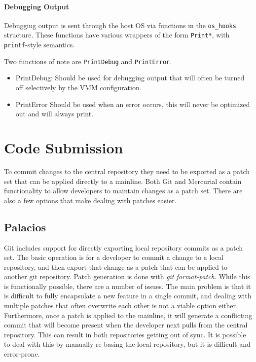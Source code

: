 \documentclass[11pt]{article}
\begin{document}
\paragraph*{Debugging Output}
Debugging output is sent through the host OS via functions in the
\verb.os_hooks. structure. These functions have various wrappers of the form
\verb.Print*., with \texttt{printf}-style semantics. 

Two functions of note are \verb.PrintDebug. and \verb.PrintError..

\begin{itemize}

\item PrintDebug:
\newline
Should be used for debugging output that will often be turned off
selectively by the VMM configuration.

\item PrintError
\newline
Should be used when an error occurs, this will never be optimized out
and will always print. 
\end{itemize}


\section{Code Submission}
\label{sec:submission}

To commit changes to the central repository they need to be exported
as a patch set that can be applied directly to a mainline. Both Git
and Mercurial contain functionality to allow developers to maintain
changes as a patch set. There are also a few options that make dealing
with patches easier.

\subsection{Palacios}

Git includes support for directly exporting local repository commits
as a patch set. The basic operation is for a developer to commit a
change to a local repository, and then export that change as a patch
that can be applied to another git repository.  Patch generation is
done with {\em git format-patch}.  While this is functionally
possible, there are a number of issues. The main problem is that it is
difficult to fully encapsulate a new feature in a single commit, and
dealing with multiple patches that often overwrite each other is not a
viable option either. Furthermore, once a patch is applied to the
mainline, it will generate a conflicting commit that will become
present when the developer next pulls from the central
repository. This can result in both repositories getting out of
sync. It is possible to deal with this by manually re-basing the local
repository, but it is difficult and error-prone.
\end{document}
